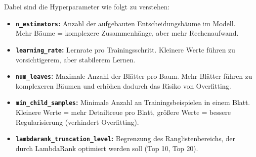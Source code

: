 Dabei sind die Hyperparameter wie folgt zu verstehen:

\begin{itemize}
    \item \textbf{\texttt{n\_estimators}:} Anzahl der aufgebauten Entscheidungsbäume im Modell. Mehr Bäume = komplexere Zusammenhänge, aber mehr Rechenaufwand.
    \item \textbf{\texttt{learning\_rate}:} Lernrate pro Trainingsschritt. Kleinere Werte führen zu vorsichtigerem, aber stabilerem Lernen.
    \item \textbf{\texttt{num\_leaves}:} Maximale Anzahl der Blätter pro Baum. Mehr Blätter führen zu komplexeren Bäumen und erhöhen dadurch das Risiko von Overfitting. 
    \item \textbf{\texttt{min\_child\_samples}:} Minimale Anzahl an Trainingsbeispielen in einem Blatt. Kleinere Werte = mehr Detailtreue pro Blatt, größere Werte = bessere Regularisierung (verhindert Overfitting).
    \item \textbf{\texttt{lambdarank\_\allowbreak truncation\_level}:} Begrenzung des Ranglistenbereichs, der durch LambdaRank optimiert werden soll (Top 10, Top 20).
\end{itemize}



